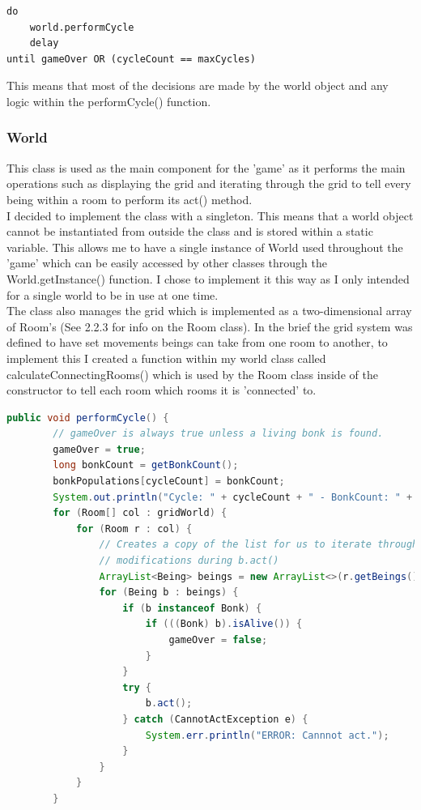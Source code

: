 \documentclass[12pt]{article}
\begin{document}
\begin{lstlisting}[caption=Game loop, basicstyle=\small]
do
	world.performCycle
	delay
until gameOver OR (cycleCount == maxCycles)
\end{lstlisting}

This means that most of the decisions are made by the world object and any logic within the performCycle() function.

\subsubsection{World}
This class is used as the main component for the 'game' as it performs the main operations such as displaying the grid and iterating through the grid to tell every being within a room to perform its act() method. \\

I decided to implement the class with a singleton. This means that a world object cannot be instantiated from outside the class and is stored within a static variable. This allows me to have a single instance of World used throughout the 'game' which can be easily accessed by other classes through the World.getInstance() function. I chose  to implement it this way as I only intended for a single world to be in use at one time.\\

The class also manages the grid which is implemented as a two-dimensional array of Room's (See 2.2.3 for info on the Room class). In the brief the grid system was defined to have set movements beings can take from one room to another, to implement this I created a function within my world class called calculateConnectingRooms() which is used by the Room class inside of the constructor to tell each room which rooms it is 'connected' to.

\begin{lstlisting}[language=Java, basicstyle=\tiny, caption=performCycle function]
    public void performCycle() {
        // gameOver is always true unless a living bonk is found.
        gameOver = true;
        long bonkCount = getBonkCount();
        bonkPopulations[cycleCount] = bonkCount;
        System.out.println("Cycle: " + cycleCount + " - BonkCount: " + bonkCount);
        for (Room[] col : gridWorld) {
            for (Room r : col) {
                // Creates a copy of the list for us to iterate through despite
                // modifications during b.act()
                ArrayList<Being> beings = new ArrayList<>(r.getBeings());
                for (Being b : beings) {
                    if (b instanceof Bonk) {
                        if (((Bonk) b).isAlive()) {
                            gameOver = false;
                        }
                    }
                    try {
                        b.act();
                    } catch (CannotActException e) {
                        System.err.println("ERROR: Cannnot act.");
                    }
                }
            }
        }
\end{lstlisting}
\end{document}
